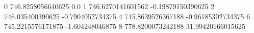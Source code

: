 0 746.8258056640625 0.0
1 746.6270141601562 -0.19879150390625
2 746.035400390625 -0.7904052734375
4 745.8639526367188 -0.96185302734375
6 745.2215576171875 -1.604248046875
8 778.8200073242188 31.99420166015625
